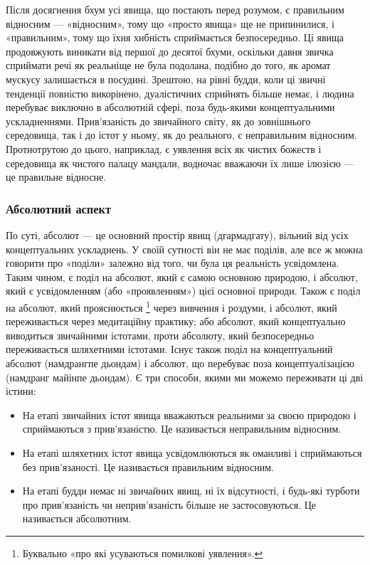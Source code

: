 \documentclass{article}
\begin{document}
Після досягнення бхум усі явища, що постають перед  розумом, є правильним відносним — «відносним»,
тому що «просто явища» ще не припинилися, і «правильним», тому що їхня хибність сприймається безпосередньо.
Ці явища продовжують виникати від першої до десятої бхуми, оскільки давня звичка сприймати речі як
реальніще не була подолана, подібно до того, як аромат мускусу залишається в посудині. Зрештою,
на рівні будди, коли ці звичні тенденції повністю викорінено, дуалістичних сприйнять більше немає,
і людина перебуває виключно в абсолютній сфері, поза будь-якими концептуальними ускладненнями.
Прив’язаність до звичайного світу, як до зовнішнього середовища, так і до істот у ньому, як до
реального, є неправильним відносним. Протиотрутою до цього, наприклад, є уявлення всіх як чистих
божеств і середовища як чистого палацу мандали, водночас вважаючи їх лише ілюзією — це правильне відносне.

\subsubsection{Абсолютний аспект}

По суті, абсолют — це основний простір явищ (дгармадгату), вільний від усіх концептуальних ускладнень. У своїй сутності він не має поділів, але все ж можна говорити про «поділи» залежно від того, чи була ця реальність усвідомлена. Таким чином, є поділ на абсолют, який є самою основною природою, і абсолют, який є усвідомленням (або «проявленням») цієї основної природи. Також є поділ на абсолют, який прояснюється \footnote{Буквально «про які усуваються помилкові уявлення».} через вивчення і роздуми, і абсолют, який переживається через медитаційну практику; або абсолют, який концептуально виводиться звичайними істотами, проти абсолюту, який безпосередньо переживається шляхетними істотами. Існує також поділ на концептуальний абсолют (намдрангпе дьондам) і абсолют, що перебуває поза концептуалізацією (намдранг майінпе дьондам). Є три способи, якими ми можемо переживати ці дві істини:

\begin{itemize}
\item На етапі звичайних істот явища вважаються реальними за своєю природою і сприймаються з прив’язаністю. Це називається неправильним відносним.
\item На етапі шляхетних істот явища усвідомлюються як оманливі і сприймаються без прив’язаності. Це називається правильним відносним.
\item На етапі будди немає ні звичайних явищ, ні їх відсутності, і будь-які турботи про прив’язаність чи неприв’язаність більше не застосовуються. Це називається абсолютним.
\end{itemize}
\end{document}
